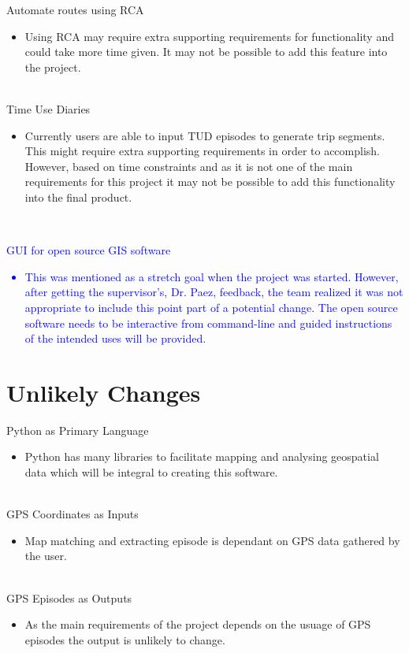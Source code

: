 \documentclass[12pt, titlepage]{article}
\begin{document}
Automate routes using RCA
\begin{itemize}
\item Using RCA may require extra supporting requirements for functionality and could take more time given. It may not be possible to add this feature into the project.
\end{itemize}
\\
Time Use Diaries
\begin{itemize}
\item Currently users are able to input TUD episodes to generate trip segments. This might require extra supporting requirements in order to accomplish. However, based on time constraints and as it is not one of the main requirements for this project it may not be possible to add this functionality into the final product.
\end{itemize}
\\
\textcolor{blue}{GUI for open source GIS software
\begin{itemize}
\item This was mentioned as a stretch goal when the project was started. However, after getting the supervisor's, Dr. Paez, feedback, the team realized it was not appropriate to include this point part of a potential change. The open source software needs to be interactive from command-line and guided instructions of the intended uses will be provided. 
\end{itemize}
}
\section{Unlikely Changes}

Python as Primary Language
\begin{itemize}
\item Python has many libraries to facilitate mapping and analysing geospatial data which will be integral to creating this software. 
\end{itemize}
\\
GPS Coordinates as Inputs
\begin{itemize}
\item Map matching and extracting episode is dependant on GPS data gathered by the user. 
\end{itemize}
\\
GPS Episodes as Outputs 
\begin{itemize}
\item As the main requirements of the project depends on the usuage of GPS episodes the output is unlikely to change.
\end{itemize}
\end{document}
